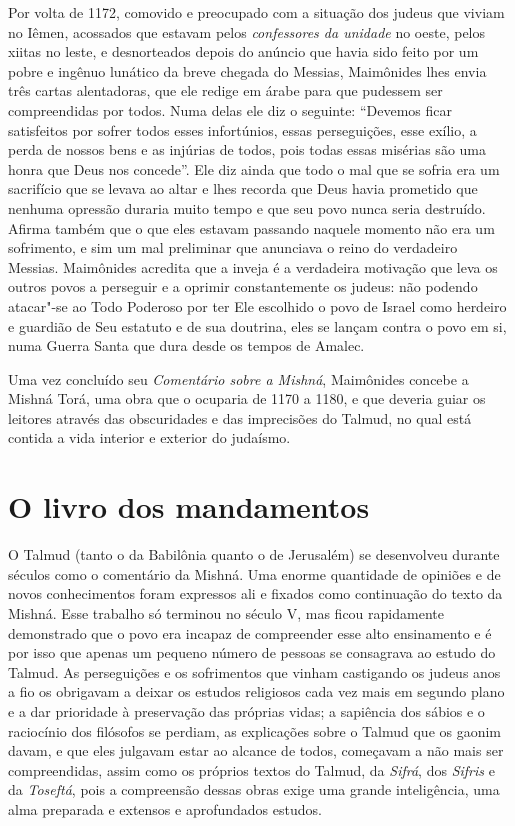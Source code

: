 Por volta de 1172, comovido e preocupado com a situação dos judeus que
viviam no Iêmen, acossados que estavam pelos \emph{confessores da unidade}
no oeste, pelos xiitas no leste, e desnorteados depois do anúncio que
havia sido feito por um pobre e ingênuo lunático da breve chegada do Messias, 
Maimônides lhes envia três cartas alentadoras, que ele
redige em árabe para que pudessem ser compreendidas por todos. Numa
delas ele diz o seguinte: ``Devemos ficar satisfeitos por sofrer todos
esses infortúnios, essas perseguições, esse exílio, a perda de nossos
bens e as injúrias de todos, pois todas essas misérias são uma honra que
Deus nos concede''. Ele diz ainda que todo o mal que se sofria era um
sacrifício que se levava ao altar e lhes recorda que Deus havia
prometido que nenhuma opressão duraria muito tempo e que seu povo nunca
seria destruído. Afirma também que o que eles estavam passando naquele
momento não era um sofrimento, e sim um mal preliminar que anunciava o
reino do verdadeiro Messias. Maimônides acredita que a inveja é a
verdadeira motivação que leva os outros povos a perseguir e a oprimir
constantemente os judeus: não podendo atacar"-se ao Todo Poderoso por
ter Ele escolhido o povo de Israel como herdeiro e guardião de Seu
estatuto e de sua doutrina, eles se lançam contra o povo em si, numa
Guerra Santa que dura desde os tempos de Amalec.

Uma vez concluído seu \emph{Comentário sobre a Mishná}, Maimônides
concebe a Mishná Torá, uma obra que o ocuparia de 1170 a 1180, e
que deveria guiar os leitores através das obscuridades e das
imprecisões do Talmud, no qual está contida a vida interior e exterior
do judaísmo.

\section{O livro dos mandamentos}

O Talmud (tanto o da Babilônia quanto o de Jerusalém) se
desenvolveu durante séculos como o comentário da Mishná. Uma
enorme quantidade de opiniões e de novos conhecimentos foram expressos
ali e fixados como continuação do texto da Mishná. Esse trabalho
só terminou no século V, mas ficou rapidamente demonstrado que o povo
era incapaz de compreender esse alto ensinamento e é por isso que apenas
um pequeno número de pessoas se consagrava ao estudo do Talmud.
As perseguições e os sofrimentos que vinham castigando os judeus anos a
fio os obrigavam a deixar os estudos religiosos cada vez mais em segundo
plano e a dar prioridade à preservação das próprias vidas; a sapiência
dos sábios e o raciocínio dos filósofos se perdiam, as explicações sobre
o Talmud que os gaonim davam, e que eles julgavam estar ao
alcance de todos, começavam a não mais ser compreendidas, assim como os
próprios textos do Talmud, da \emph{Sifrá}, dos \emph{Sifris} e
da \emph{Toseftá}, pois a compreensão dessas obras exige uma grande
inteligência, uma alma preparada e extensos e aprofundados estudos.

